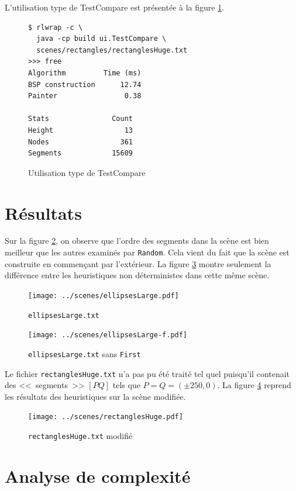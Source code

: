 \documentclass[12pt,twocolumn]{article}
\begin{document}
L'utilisation type de TestCompare est présentée à la figure \ref{fig:cmp}.

\begin{figure}[h]
\begin{verbatim}
$ rlwrap -c \
  java -cp build ui.TestCompare \
  scenes/rectangles/rectanglesHuge.txt
>>> free
Algorithm         Time (ms)
BSP construction      12.74
Painter                0.38

Stats               Count
Height                 13
Nodes                 361
Segments            15609
\end{verbatim}
\caption{Utilisation type de TestCompare}\label{fig:cmp}
\end{figure}


\section{Résultats}
Sur la figure \ref{fig:eL}, on observe que l'ordre des segments dans la
scène est bien meilleur que les autres examinés par \texttt{Random}. Cela vient
du fait que la scène est construite en commençant par l'extérieur.
La figure \ref{fig:eL-n} montre seulement la différence entre
les heuristiques non déterministes dans cette même scène.
\begin{figure}[p]
\center
\texttt{[image: ../scenes/ellipsesLarge.pdf]}
\caption{\texttt{ellipsesLarge.txt}}\label{fig:eL}
\end{figure}
\begin{figure}[p]
\center
\texttt{[image: ../scenes/ellipsesLarge-f.pdf]}
\caption{\texttt{ellipsesLarge.txt} sans \texttt{First}}\label{fig:eL-n}
\end{figure}

Le fichier \texttt{rectanglesHuge.txt} n'a pas pu été traité tel quel puisqu'il
contenait des <<~segments~>> $[PQ]$ tels que $P=Q=(\pm250,0)$.
La figure \ref{fig:eR} reprend les résultats des heuristiques
sur la scène modifiée.

\begin{figure}[p]
\center
\texttt{[image: ../scenes/rectanglesHuge.pdf]}
\caption{\texttt{rectanglesHuge.txt} modifié}\label{fig:eR}
\end{figure}


\section{Analyse de complexité}
\end{document}
